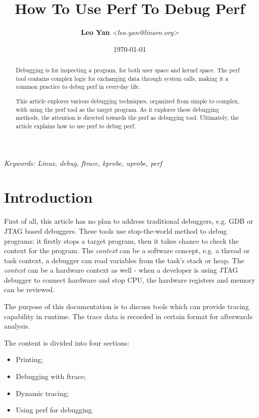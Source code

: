 \documentclass[11pt]{diazessay} %
\title{\textbf{How To Use Perf To Debug Perf}}
\author{\textbf{Leo Yan} \textit{<leo.yan@linaro.org>}} %
\date{\today} %
\begin{document}
\maketitle %


\begin{abstract}
Debugging is for inspecting a program, for both user space and kernel space.
The perf tool contains complex logic for exchanging data through system calls,
making it a common practice to debug perf in everyday life.

This article explores various debugging techniques, organized from simple to
complex, with using the perf tool as the target program. As it explores these
debugging methods, the attention is directed towards the perf as debugging
tool. Ultimately, the article explains how to use perf to debug perf.
\end{abstract}

\hspace*{3.6mm}\textit{Keywords: Linux, debug, ftrace, kprobe, uprobe, perf } %
\vspace{30pt} %


\section*{Introduction}

First of all, this article has no plan to address traditional debuggers, e.g.
GDB or JTAG based debuggers. These tools use stop-the-world method to debug
programs: it firstly stops a target program, then it takes chance to check
the context for the program. The \textit{context} can be a software concept,
e.g. a thread or task context, a debugger can read variables from the task's
stack or heap. The \textit{context} can be a hardware context as well - when
a developer is using JTAG debugger to connect hardware and stop CPU, the
hardware registers and memory can be reviewed.

The purpose of this documentation is to discuss tools which can provide
tracing capability in runtime. The trace data is recorded in certain format
for afterwards analysis.

The content is divided into four sections:
\begin{itemize}
	\item Printing;
	\item Debugging with ftrace;
	\item Dynamic tracing;
	\item Using perf for debugging.
\end{itemize}
\end{document}
